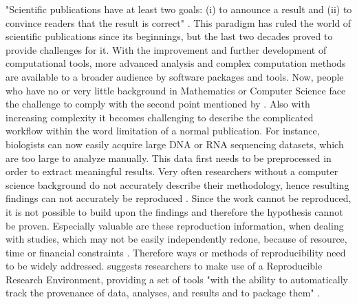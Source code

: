 "Scientific publications have at least two goals: (i) to announce a result and (ii) to convince readers that the result is correct" \citep{Mesirov2010}.
This paradigm has ruled the world of scientific publications since its beginnings, but the last two decades proved to provide challenges for it. With the improvement and further development of computational tools, more advanced analysis and complex computation methods are available to a broader audience by software packages and tools. Now, people who have no or very little background in Mathematics or Computer Science face the challenge to comply with the second point mentioned by \citeauthor{Mesirov2010}. Also with increasing complexity it becomes challenging to describe the complicated workflow within the word limitation of a normal publication.
For instance, biologists can now easily acquire large DNA or RNA sequencing datasets, which  are too large to analyze manually.
This data first needs to be preprocessed in order to extract meaningful results. %
Very often researchers without a computer science background do not accurately describe their methodology, hence resulting findings can not accurately be reproduced \citep{Peng2011}.
Since the work cannot be reproduced, it is not possible to build upon the findings and therefore the hypothesis cannot be proven.
Especially valuable are these reproduction information, when dealing with studies, which may not be easily independently redone, because of resource, time or financial constraints \citep{Peng2011}.
 
Therefore ways or methods of reproducibility need to be widely addressed. \citeauthor{Mesirov2010} suggests researchers to make use of a Reproducible Research Environment, providing a set of tools "with the ability to automatically track the provenance of data, analyses, and results and to package them" \citep{Mesirov2010}.


